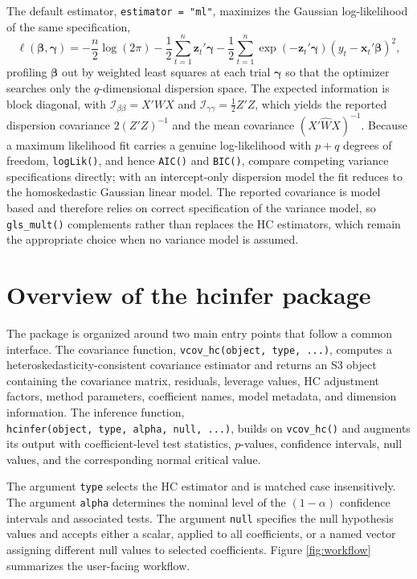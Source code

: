The default estimator, \texttt{estimator\ =\ "ml"}, maximizes the Gaussian log-likelihood of the same specification,
\[
\ell(\boldsymbol{\beta},\boldsymbol{\gamma})=
-\frac{n}{2}\log(2\pi)
-\frac{1}{2}\sum_{t=1}^{n}\mathbf{z}_t'\boldsymbol{\gamma}
-\frac{1}{2}\sum_{t=1}^{n}\exp(-\mathbf{z}_t'\boldsymbol{\gamma})(y_t-\mathbf{x}_t'\boldsymbol{\beta})^2,
\]
profiling \(\boldsymbol{\beta}\) out by weighted least squares at each trial \(\boldsymbol{\gamma}\) so that the optimizer searches only the \(q\)-dimensional dispersion space. The expected information is block diagonal, with \(\mathcal{I}_{\beta\beta}=X'WX\) and \(\mathcal{I}_{\gamma\gamma}=\tfrac{1}{2}Z'Z\), which yields the reported dispersion covariance \(2(Z'Z)^{-1}\) and the mean covariance \((X'\widehat W X)^{-1}\). Because a maximum likelihood fit carries a genuine log-likelihood with \(p+q\) degrees of freedom, \texttt{logLik()}, and hence \texttt{AIC()} and \texttt{BIC()}, compare competing variance specifications directly; with an intercept-only dispersion model the fit reduces to the homoskedastic Gaussian linear model. The reported covariance is model based and therefore relies on correct specification of the variance model, so \texttt{gls\_mult()} complements rather than replaces the HC estimators, which remain the appropriate choice when no variance model is assumed.

\section{Overview of the hcinfer package}\label{overview-of-the-hcinfer-package}

The package is organized around two main entry points that follow a common interface. The covariance function, \texttt{vcov\_hc(object,\ type,\ ...)}, computes a heteroskedasticity-consistent covariance estimator and returns an S3 object containing the covariance matrix, residuals, leverage values, HC adjustment factors, method parameters, coefficient names, model metadata, and dimension information. The inference function, \texttt{hcinfer(object,\ type,\ alpha,\ null,\ ...)}, builds on \texttt{vcov\_hc()} and augments its output with coefficient-level test statistics, \(p\)-values, confidence intervals, null values, and the corresponding normal critical value.

The argument \texttt{type} selects the HC estimator and is matched case insensitively. The argument \texttt{alpha} determines the nominal level of the \((1-\alpha)\) confidence intervals and associated tests. The argument \texttt{null} specifies the null hypothesis values and accepts either a scalar, applied to all coefficients, or a named vector assigning different null values to selected coefficients. Figure \ref{fig:workflow} summarizes the user-facing workflow.

